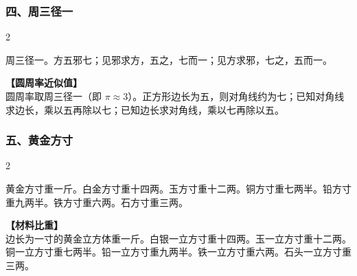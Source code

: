 \documentclass[11pt,a4paper]{article}
\begin{document}
\subsubsection*{四、周三径一}
\begin{paracol}{2}
\begin{problemclassical}
周三径一。方五邪七；见邪求方，五之，七而一；见方求邪，七之，五而一。
\end{problemclassical}
\switchcolumn
\begin{problemmodern}
\textbf{【圆周率近似值】}\\
圆周率取周三径一（即 $\pi \approx 3$）。正方形边长为五，则对角线约为七；已知对角线求边长，乘以五再除以七；已知边长求对角线，乘以七再除以五。
\end{problemmodern}
\end{paracol}

\vspace{0.3cm}

\subsubsection*{五、黄金方寸}
\begin{paracol}{2}
\begin{problemclassical}
黄金方寸重一斤。白金方寸重十四两。玉方寸重十二两。铜方寸重七两半。铅方寸重九两半。铁方寸重六两。石方寸重三两。
\end{problemclassical}
\switchcolumn
\begin{problemmodern}
\textbf{【材料比重】}\\
边长为一寸的黄金立方体重一斤。白银一立方寸重十四两。玉一立方寸重十二两。铜一立方寸重七两半。铅一立方寸重九两半。铁一立方寸重六两。石头一立方寸重三两。
\end{problemmodern}
\end{paracol}

\vspace{0.3cm}
\end{document}
